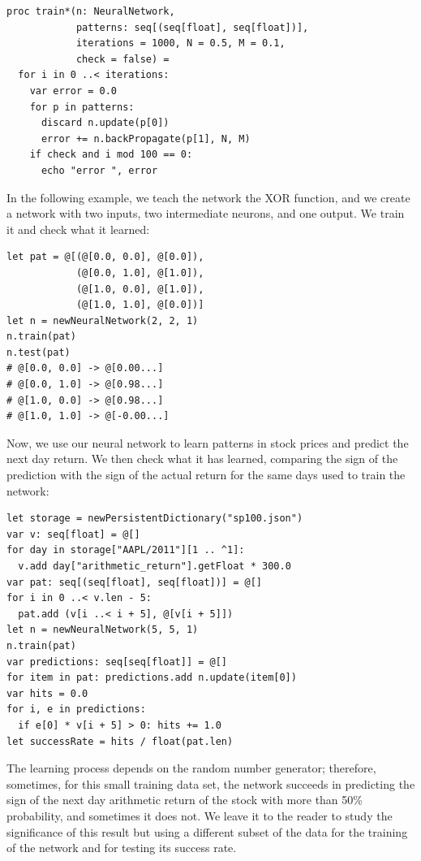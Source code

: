 \documentclass[justified, sixbynine]{tufte-book}
\def\ft{\small\tt}
\theoremstyle{plain}%
\newtheorem * {corollary}{Corollary}
\theoremstyle{definition}
\theoremstyle{remark}
\newtheorem * {remark}{Remark}
\newtheorem * {note}{Note}
\begin{document}
\begin{fullwidth}
\begin{lstlisting}[caption={in file: {\ft nlib/neural.nim}}]
proc train*(n: NeuralNetwork,
            patterns: seq[(seq[float], seq[float])],
            iterations = 1000, N = 0.5, M = 0.1,
            check = false) =
  for i in 0 ..< iterations:
    var error = 0.0
    for p in patterns:
      discard n.update(p[0])
      error += n.backPropagate(p[1], N, M)
    if check and i mod 100 == 0:
      echo "error ", error
\end{lstlisting}

In the following example, we teach the network the XOR function, and we create a network with two inputs, two intermediate neurons, and one output. We train it and check what it learned:

\begin{lstlisting}
let pat = @[(@[0.0, 0.0], @[0.0]),
            (@[0.0, 1.0], @[1.0]),
            (@[1.0, 0.0], @[1.0]),
            (@[1.0, 1.0], @[0.0])]
let n = newNeuralNetwork(2, 2, 1)
n.train(pat)
n.test(pat)
# @[0.0, 0.0] -> @[0.00...]
# @[0.0, 1.0] -> @[0.98...]
# @[1.0, 0.0] -> @[0.98...]
# @[1.0, 1.0] -> @[-0.00...]
\end{lstlisting}

Now, we use our neural network to learn patterns in stock prices and predict the next day return. We then check what it has learned, comparing the sign of the prediction with the sign of the actual return for the same days used to train the network:
\begin{lstlisting}[caption={in file: {\ft test.nim}}]
let storage = newPersistentDictionary("sp100.json")
var v: seq[float] = @[]
for day in storage["AAPL/2011"][1 .. ^1]:
  v.add day["arithmetic_return"].getFloat * 300.0
var pat: seq[(seq[float], seq[float])] = @[]
for i in 0 ..< v.len - 5:
  pat.add (v[i ..< i + 5], @[v[i + 5]])
let n = newNeuralNetwork(5, 5, 1)
n.train(pat)
var predictions: seq[seq[float]] = @[]
for item in pat: predictions.add n.update(item[0])
var hits = 0.0
for i, e in predictions:
  if e[0] * v[i + 5] > 0: hits += 1.0
let successRate = hits / float(pat.len)
\end{lstlisting}
The learning process depends on the random number generator; therefore, sometimes, for this small training data set, the network succeeds in predicting the sign of the next day arithmetic return of the stock with more than 50\% probability, and sometimes it does not. We leave it to the reader to study the significance of this result but using a different subset of the data for the training of the network and for testing its success rate.


\end{fullwidth}
\end{document}

